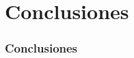 \documentclass{beamer}
\begin{document}
\section{Conclusiones}
\begin{frame}
    \frametitle{Conclusiones}
\end{frame}

\end{document}
